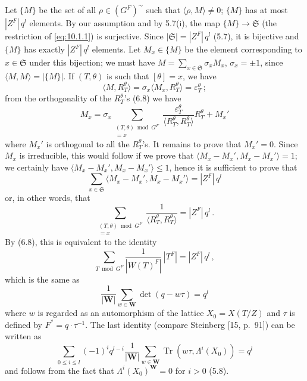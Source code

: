 \documentclass{amsart}
\theoremstyle{plain}
\theoremstyle{remark}
\DeclareMathOperator{\Tr}{Tr}
\begin{document}
Let $\{M\}$ be the set of all $\rho \in (G^F)^{\sim}$ such that $\langle \rho, M \rangle \neq 0$; $\{M\}$ has at most $|Z^F|\, q^l$ elements. By our assumption and by 5.7(i), the map $\{M\} \to \mathfrak{S}$ (the restriction of \eqref{eq:10.1.1}) is surjective. Since $|\mathfrak{S}| = |Z^F|\, q^l$ (5.7), it is bijective and $\{M\}$ has exactly $|Z^F|\, q^l$ elements. Let $M_x \in \{M\}$ be the element corresponding to $x \in \mathfrak{S}$ under this bijection; we must have $M = \sum_{x \in \mathfrak{S}} \sigma_x M_x$, $\sigma_x = \pm 1$, since $\langle M, M \rangle = |\{M\}|$. If $(T, \theta)$ is such that $[\theta] = x$, we have
\[
\langle M, R_T^\theta \rangle = \sigma_x \langle M_x, R_T^\theta \rangle = \varepsilon_T^\theta\,;
\]
from the orthogonality of the $R_T^\theta$'s (6.8) we have
\[
M_x = \sigma_x \sum_{\substack{(T, \theta) \bmod G^F \\ [\theta] = x}} \frac{\varepsilon_T^\theta}{\langle R_T^\theta, R_T^\theta \rangle} R_T^\theta + M_x'
\]
where $M_x'$ is orthogonal to all the $R_T^\theta$'s. It remains to prove that $M_x' = 0$. Since $M_x$ is irreducible, this would follow if we prove that $\langle M_x - M_x', M_x - M_x' \rangle = 1$; we certainly have $\langle M_x - M_x', M_x - M_x' \rangle \le 1$, hence it is sufficient to prove that
\[
\sum_{x \in \mathfrak{S}} \langle M_x - M_x', M_x - M_x' \rangle = |Z^F|\, q^l
\]
or, in other words, that
\[
\sum_{\substack{(T, \theta) \bmod G^F \\ [\theta] = x}} \frac{1}{\langle R_T^\theta, R_T^\theta \rangle} = |Z^F|\, q^l\,.
\]
By (6.8), this is equivalent to the identity
\[
\sum_{T \bmod G^F} \frac{1}{|W(T)^F|}\, |T^F| = |Z^F|\, q^l\,,
\]
which is the same as
\[
\frac{1}{|\mathbf{W}|} \sum_{w \in \mathbf{W}} \det(q - w\tau) = q^l
\]
where $w$ is regarded as an automorphism of the lattice $X_0 = X(T/Z)$ and $\tau$ is defined by $F^* = q \cdot \tau^{-1}$. The last identity (compare Steinberg [15, p.~91]) can be written as
\[
\sum_{0 \le i \le l} (-1)^i q^{l-i} \frac{1}{|\mathbf{W}|} \sum_{w \in \mathbf{W}} \Tr(w\tau, \Lambda^i(X_0)) = q^l
\]
and follows from the fact that $\Lambda^i(X_0)^{\mathbf{W}} = 0$ for $i > 0$ (5.8).
\end{document}
